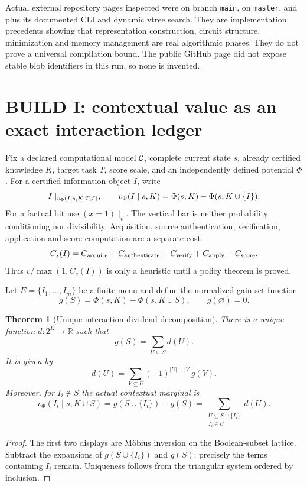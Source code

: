 \documentclass[11pt]{article}
\newtheorem{theorem}{Theorem}
\begin{document}
Actual external repository pages inspected were
 on branch \texttt{main},
 on \texttt{master}, and
 plus its documented CLI and dynamic vtree
search.  They are implementation precedents showing that representation
construction, circuit structure, minimization and memory management are real
algorithmic phases.  They do not prove a universal compilation bound.  The
public GitHub page did not expose stable blob identifiers in this run, so none
is invented.

\section{BUILD I: contextual value as an exact interaction ledger}
Fix a declared computational model ${\cal C}$, complete current state $s$,
already certified knowledge $K$, target task $T$, score scale, and an
independently defined potential $\Phi$.  For a certified information object
$I$, write
\[
 I\mid_{v_\Phi(I\mid s,K,T,{\cal C})},\qquad
 v_\Phi(I\mid s,K)=\Phi(s,K)-\Phi(s,K\cup\{I\}).
\]
For a factual bit use $(x=1)\mid_v$.  The vertical bar is neither probability
conditioning nor divisibility.  Acquisition, source authentication,
verification, application and score computation are a separate cost
\[
 C_s(I)=C_{\rm acquire}+C_{\rm authenticate}+C_{\rm verify}
       +C_{\rm apply}+C_{\rm score}.
\]
Thus $v/\max(1,C_s(I))$ is only a heuristic until a policy theorem is proved.

Let $E=\{I_1,\dots,I_m\}$ be a finite menu and define the normalized gain
set function
\[
 g(S)=\Phi(s,K)-\Phi(s,K\cup S),\qquad g(\varnothing)=0.
\]

\begin{theorem}[Unique interaction-dividend decomposition]\label{thm:mobius}
There is a unique function $d:2^E\to\mathbb R$ such that
\[
 g(S)=\sum_{U\subseteq S}d(U).
\]
It is given by
\[
 d(U)=\sum_{V\subseteq U}(-1)^{|U|-|V|}g(V).
\]
Moreover, for $I_i\notin S$ the actual contextual marginal is
\[
 v_\Phi(I_i\mid s,K\cup S)
 =g(S\cup\{I_i\})-g(S)
 =\sum_{\substack{U\subseteq S\cup\{I_i\}\\I_i\in U}}d(U).
\]
\end{theorem}
\begin{proof}
The first two displays are M\"obius inversion on the Boolean-subset lattice.
Subtract the expansions of $g(S\cup\{I_i\})$ and $g(S)$; precisely the terms
containing $I_i$ remain.  Uniqueness follows from the triangular system ordered
by inclusion.
\end{proof}
\end{document}
